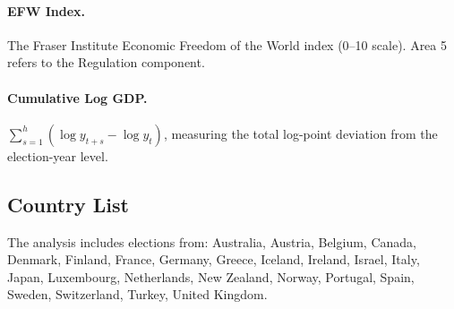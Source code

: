 \documentclass[12pt,a4paper]{article}
\begin{document}
\paragraph{EFW Index.}
The Fraser Institute Economic Freedom of the World index (0--10 scale). 
Area 5 refers to the Regulation component.

\paragraph{Cumulative Log GDP.}
$\sum_{s=1}^{h} (\log y_{t+s} - \log y_t)$, measuring the total log-point 
deviation from the election-year level.

\subsection{Country List}
The analysis includes elections from: Australia, Austria, Belgium, Canada, 
Denmark, Finland, France, Germany, Greece, Iceland, Ireland, Israel, 
Italy, Japan, Luxembourg, Netherlands, New Zealand, Norway, Portugal, 
Spain, Sweden, Switzerland, Turkey, United Kingdom.
\end{document}
